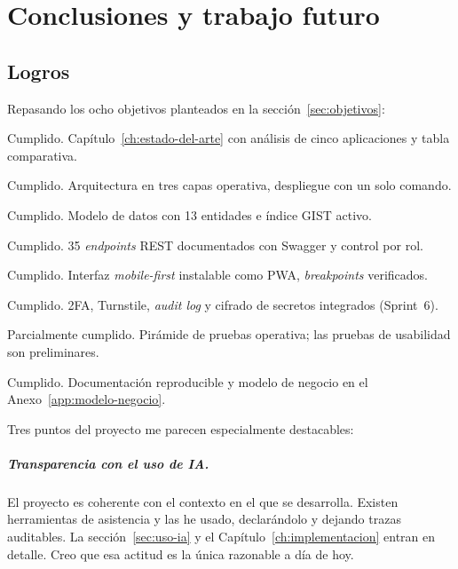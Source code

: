 \chapter{Conclusiones y trabajo futuro}
\label{ch:conclusiones}

\section{Logros}
\label{sec:logros}

Repasando los ocho objetivos planteados en la sección~\ref{sec:objetivos}:

\begin{description}[leftmargin=2cm, style=nextline, labelindent=0.3cm]
  \item[OBJ-1.] Cumplido. Capítulo~\ref{ch:estado-del-arte} con análisis de cinco aplicaciones y tabla comparativa.
  \item[OBJ-2.] Cumplido. Arquitectura en tres capas operativa, despliegue con un solo comando.
  \item[OBJ-3.] Cumplido. Modelo de datos con 13 entidades e índice GIST activo.
  \item[OBJ-4.] Cumplido. 35 \textit{endpoints} REST documentados con Swagger y control por rol.
  \item[OBJ-5.] Cumplido. Interfaz \textit{mobile-first} instalable como PWA, \textit{breakpoints} verificados.
  \item[OBJ-6.] Cumplido. 2FA, Turnstile, \textit{audit log} y cifrado de secretos integrados (Sprint~6).
  \item[OBJ-7.] Parcialmente cumplido. Pirámide de pruebas operativa; las pruebas de usabilidad son preliminares.
  \item[OBJ-8.] Cumplido. Documentación reproducible y modelo de negocio en el Anexo~\ref{app:modelo-negocio}.
\end{description}

Tres puntos del proyecto me parecen especialmente destacables:

\paragraph{Transparencia con el uso de IA.}  El proyecto es coherente con el contexto en el que se desarrolla. Existen herramientas de asistencia y las he usado, declarándolo y dejando trazas auditables. La sección~\ref{sec:uso-ia} y el Capítulo~\ref{ch:implementacion} entran en detalle. Creo que esa actitud es la única razonable a día de hoy.

